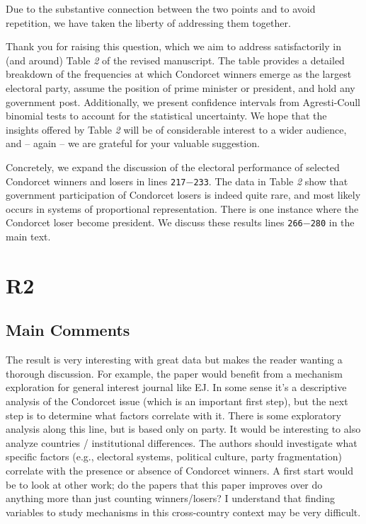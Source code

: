 \documentclass[a4paper, 12pt]{scrartcl}
\theoremstyle{break}
\newenvironment{changes}{\par\color{violet}\par\addvspace{\baselineskip}}{\par\addvspace{\baselineskip}}
\begin{document}
Due to the substantive connection between the two points and to avoid repetition, we have taken the liberty of addressing them together.

Thank you for raising this question, which we aim to address satisfactorily in (and around) Table \textit{2} of the revised manuscript. The table provides a detailed breakdown of the frequencies at which Condorcet winners emerge as the largest electoral party, assume the position of prime minister or president, and hold any government post. Additionally, we present confidence intervals from Agresti-Coull binomial tests to account for the statistical uncertainty. We hope that the insights offered by Table \textit{2} will be of considerable interest to a wider audience, and -- again -- we are grateful for your valuable suggestion.

Concretely, we expand the discussion of the electoral performance of selected Condorcet winners and losers in lines \texttt{217$-$233}. The data in Table \textit{2} show that government participation of Condorcet losers is indeed quite rare, and most likely occurs in systems of proportional representation. There is one instance where the Condorcet loser become president. We discuss these results lines \texttt{266$-$280} in the main text.


\newpage
\section*{R2}
\subsection*{Main Comments}
\begin{changes}
	The result is very interesting with great data but makes the reader wanting a thorough discussion. For example, the paper would benefit from a mechanism exploration for general interest journal like EJ. In some sense it’s a descriptive analysis of the Condorcet issue (which is an important first step), but the next step is to determine what factors correlate with it. There is some exploratory analysis along this line, but is based only on party. It would be interesting to also analyze countries / institutional differences. The authors should investigate what specific factors (e.g., electoral systems, political culture, party fragmentation) correlate with the presence or absence of Condorcet winners. A first start would be to look at other work; do the papers
	that this paper improves over do anything more than just counting winners/losers? I understand that finding variables to study mechanisms in this cross-country context may be very difficult.
\end{changes}
\end{document}

